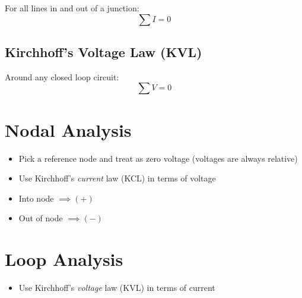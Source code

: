 \documentclass{article}
\begin{document}
    For all lines in and out of a junction: \begin{equation}
        \sum{I} = 0
    \end{equation}

    \subsection{Kirchhoff's Voltage Law (KVL)}

    Around any closed loop circuit: \begin{equation}
        \sum{V} = 0
    \end{equation}

    \section{Nodal Analysis}

    \begin{itemize}
        \item Pick a reference node and treat as zero voltage (voltages are always relative)
        \item Use Kirchhoff's \textit{current} law (KCL) in terms of voltage
        \item Into node $\implies (+)$ 
        \item Out of node $\implies (-)$
    \end{itemize}

    \section{Loop Analysis}

    \begin{itemize}
        \item Use Kirchhoff's \textit{voltage} law (KVL) in terms of current
    \end{itemize}
\end{document}
